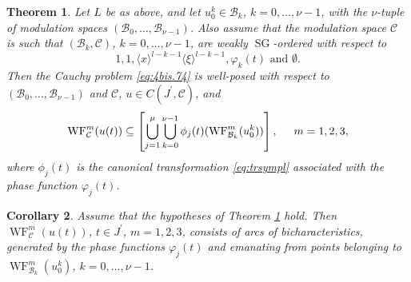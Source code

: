 \documentclass[12pt,a4paper,reqno]{amsart}
\numberwithin{equation}{section}
\newtheorem{thm}{Theorem}
\numberwithin{thm}{section}
\newtheorem{cor}[thm]{Corollary}
\theoremstyle{definition}
\theoremstyle{remark}
\begin{document}
\begin{thm}
    \label{thm:4bis.1}
    	Let $L$ be as above, and let $u_0^k\in{{\mathcal B}}_k$, $k=0,\dots,\nu-1$, with the
	$\nu$-tuple of modulation spaces
    $({{\mathcal B}}_0,\dots,{{\mathcal B}}_{\nu-1})$.
    Also assume that the modulation space ${{\mathcal C}}$ is such that $({{\mathcal B}}_k,{{\mathcal C}})$, $k=0,\dots,\nu-1$, 
    are weakly ${\operatorname{SG}}$-ordered with respect to
        \[
    	1, 1, {\langle{x}\rangle}^{l-k-1} {\langle{\xi}\rangle}^{l-k-1}, \varphi_k(t) \text{ and } \emptyset.
    \]
        Then the Cauchy problem \eqref{eq:4bis.74} is well-posed
    with respect to 
    $({{\mathcal B}}_0,\dots,{{\mathcal B}}_{\nu-1})$ and ${{\mathcal C}}$, $u\in C(J^\prime,{{\mathcal C}})$, and
        \[
    {\operatorname{WF}}^m_{{\mathcal C}}( u(t) ) \subseteq \left[ \bigcup_{j=1}^\mu \bigcup_{k=0}^{\nu-1}
	                 \phi_{j}(t)({\operatorname{WF}}^m_{{{\mathcal B}}_k} (u_{0}^k)) \right], \hspace{5mm} m=1,2,3,
     \]
        where $\phi_j(t)$ is the canonical transformation \eqref{eq:trsympl} associated
    with the phase function $\varphi_{j}(t)$.
\end{thm}
\begin{cor}
Assume that the hypotheses of Theorem \ref{thm:4bis.1} hold. Then
${\operatorname{WF}}^m_{{\mathcal C}}(u(t))$, $t\in J^\prime$, $m=1,2,3$, consists of arcs of bicharacteristics, 
generated by the phase functions $\varphi_j(t)$ and emanating from points 
belonging to  ${\operatorname{WF}}^m_{{{\mathcal B}}_k} (u_{0}^k)$, $k=0,\dots,\nu-1$.
\end{cor}
\end{document}
